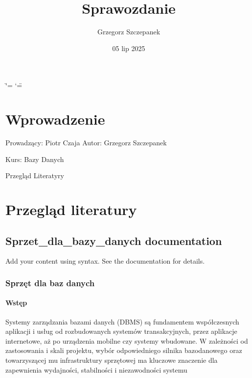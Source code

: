 \documentclass[letterpaper,10pt,polish]{sphinxmanual}
\title{Sprawozdanie}
\date{05 lip 2025}
\author{Grzegorz Szczepanek}
\begin{document}
\ifdefined\shorthandoff
  \ifnum\catcode`\=\string=\active\shorthandoff{=}\fi
  \ifnum\catcode`\"=\active{}\fi
\fi

\pagestyle{empty}
\sphinxmaketitle
\pagestyle{plain}
\sphinxtableofcontents
\pagestyle{normal}
\label{\detokenize{index::doc}}


\sphinxstepscope


\chapter{Wprowadzenie}
\label{\detokenize{rozdzial1/index:wprowadzenie}}\label{\detokenize{rozdzial1/index::doc}}
\sphinxAtStartPar
Prowadzący: Piotr Czaja
Autor: Grzegorz Szczepanek

\sphinxAtStartPar
Kurs: Bazy Danych

\sphinxAtStartPar
Przegląd Literatyry

\sphinxstepscope


\chapter{Przegląd literatury}
\label{\detokenize{rozdzial2/index:przeglad-literatury}}\label{\detokenize{rozdzial2/index::doc}}
\sphinxstepscope


\section{Sprzet\_dla\_bazy\_danych documentation}
\label{\detokenize{rozdzial2/Sprzet-dla-bazy-danych/source/index:sprzet-dla-bazy-danych-documentation}}\label{\detokenize{rozdzial2/Sprzet-dla-bazy-danych/source/index::doc}}
\sphinxAtStartPar
Add your content using  syntax. See the
documentation for details.

\sphinxstepscope


\subsection{Sprzęt dla baz danych}
\label{\detokenize{rozdzial2/Sprzet-dla-bazy-danych/source/SprzetDlaBazyDanych:sprzet-dla-baz-danych}}\label{\detokenize{rozdzial2/Sprzet-dla-bazy-danych/source/SprzetDlaBazyDanych::doc}}

\subsubsection{Wstęp}
\label{\detokenize{rozdzial2/Sprzet-dla-bazy-danych/source/SprzetDlaBazyDanych:wstep}}
\sphinxAtStartPar
Systemy zarządzania bazami danych (DBMS) są fundamentem współczesnych aplikacji i usług \textendash{} od rozbudowanych systemów transakcyjnych, przez aplikacje internetowe, aż po urządzenia mobilne czy systemy wbudowane. W zależności od zastosowania i skali projektu, wybór odpowiedniego silnika bazodanowego oraz towarzyszącej mu infrastruktury sprzętowej ma kluczowe znaczenie dla zapewnienia wydajności, stabilności i niezawodności systemu
\end{document}
